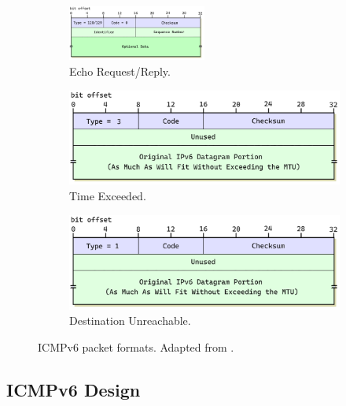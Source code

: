 \begin{figure}[htbp]
\begin{subfigure}{\textwidth}
  \centering
  \includegraphics[width=0.5\textwidth]{figures/implementation/icmpv6_echo.png}
  \caption{Echo Request/Reply.}
  \label{fig:impl-echoheader}
\end{subfigure}
\par \medskip
\begin{subfigure}{.5\textwidth}
  \centering
  \includegraphics[width=1\textwidth]{figures/implementation/icmpv6_timeexceeded.png}
  \caption{Time Exceeded.}
  \label{fig:impl-timeexheader}
\end{subfigure}%
\begin{subfigure}{.5\textwidth}
  \centering
  \includegraphics[width=1\textwidth]{figures/implementation/icmpv6_destunreachable.png}
  \caption{Destination Unreachable.}
  \label{fig:impl-destunrheader}
\end{subfigure}
\caption{ICMPv6 packet formats. Adapted from \cite{IPguide}.}
\label{fig:test}
\end{figure}


\subsection{ICMPv6 Design}
\label{sec:3.5.2}

